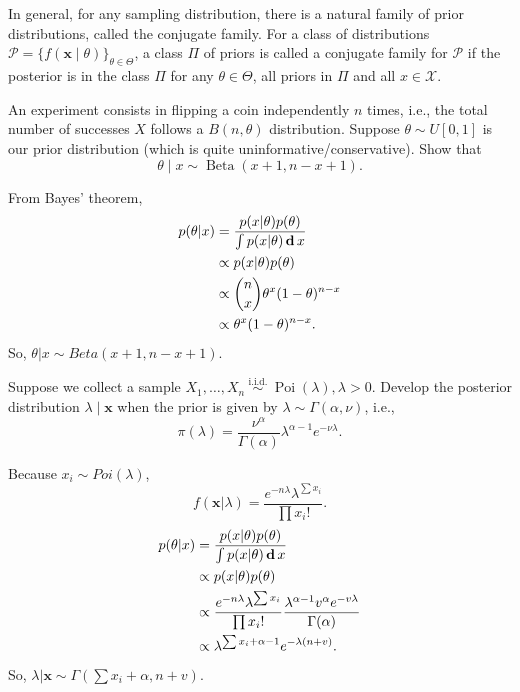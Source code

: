 \chapter{}

 In general, for any sampling distribution, there is a natural family of prior distributions, called the conjugate family. For a class of distributions \(\mathcal{P}=\{f(\mathbf{x} \mid \theta)\}_{\theta \in \Theta}\), a class \(\Pi\) of priors is called a conjugate family for \(\mathcal{P}\) if the posterior is in the class \(\Pi\) for any \(\theta \in \Theta\), all priors in \(\Pi\) and all \(x \in \mathcal{X}\).

\begin{ex}
    An experiment consists in flipping a coin independently \(n\) times, i.e., the total number of successes \(X\) follows a \(B(n, \theta)\) distribution. Suppose \(\theta \sim U[0,1]\) is our prior distribution (which is quite uninformative/conservative). Show that
    \[
        \theta \mid x \sim \operatorname{Beta}(x+1, n-x+1). 
    \]
\end{ex}

\begin{solution}
    From Bayes' theorem, 
    \begin{align*}
        p(\theta|x) &= \frac{p(x|\theta)p(\theta)}{\int p(x|\theta) \,\mathbf{d}\, x} \\
        &\propto p(x|\theta)p(\theta) \\
        &\propto \binom{n}{x} \theta^x(1-\theta)^{n-x}\\
        &\propto \theta^x(1-\theta)^{n-x}. 
    \end{align*}
    So, $\theta|x\sim Beta(x+1, n-x+1)$. 
\end{solution}

\begin{ex}
    Suppose we collect a sample \(X_{1}, \ldots, X_{n} \stackrel{\text { i.i.d. }}{\sim} \operatorname{Poi}(\lambda), \lambda>0\). Develop the posterior distribution \(\lambda \mid \mathbf{x}\) when the prior is given by \(\lambda \sim \Gamma(\alpha, \nu)\), i.e.,
    \[
        \pi(\lambda)=\frac{\nu^{\alpha}}{\Gamma(\alpha)} \lambda^{\alpha-1} e^{-\nu \lambda}. 
    \]
\end{ex}

\begin{solution}
    Because $x_i\sim Poi(\lambda)$, 
    \[
        f(\mathbf{x}|\lambda) = \frac{e^{-n\lambda}\lambda^{\sum x_i}}{\prod x_i!}. 
    \]
    \begin{align*}
        p(\theta|x) &= \frac{p(x|\theta)p(\theta)}{\int p(x|\theta) \,\mathbf{d}\, x} \\
        &\propto p(x|\theta)p(\theta) \\
        &\propto \frac{e^{-n\lambda}\lambda^{\sum x_i}}{\prod x_i!} \frac{\lambda^{\alpha-1}v^\alpha e^{-v\lambda}}{\Gamma(\alpha)} \\
        &\propto \lambda^{\sum x_i+\alpha-1} e^{-\lambda (n+v)}.
    \end{align*}
    So, $\lambda|\mathbf{x}\sim \Gamma(\sum x_i +\alpha, n+v)$. 
\end{solution}

